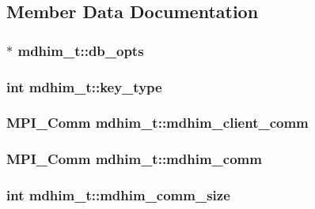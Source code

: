 \subsection{Member Data Documentation}
\hypertarget{structmdhim__t_a1e315ee5168e22e71f970eea38014375}{
\subsubsection[{db\-\_\-opts}]{$\ast$ mdhim\-\_\-t\-::db\-\_\-opts}}\label{structmdhim__t_a1e315ee5168e22e71f970eea38014375}
\hypertarget{structmdhim__t_ab38232f8b8b48edf417c87088d81d6e4}{
\subsubsection[{key\-\_\-type}]{\setlength{\rightskip}{0pt plus 5cm}int mdhim\-\_\-t\-::key\-\_\-type}}\label{structmdhim__t_ab38232f8b8b48edf417c87088d81d6e4}
\hypertarget{structmdhim__t_aa7869e9170df4067e8ee986f5e6fda69}{
\subsubsection[{mdhim\-\_\-client\-\_\-comm}]{\setlength{\rightskip}{0pt plus 5cm}M\-P\-I\-\_\-\-Comm mdhim\-\_\-t\-::mdhim\-\_\-client\-\_\-comm}}\label{structmdhim__t_aa7869e9170df4067e8ee986f5e6fda69}
\hypertarget{structmdhim__t_a9772a2d123d58e9cd3e4514b860aee97}{
\subsubsection[{mdhim\-\_\-comm}]{\setlength{\rightskip}{0pt plus 5cm}M\-P\-I\-\_\-\-Comm mdhim\-\_\-t\-::mdhim\-\_\-comm}}\label{structmdhim__t_a9772a2d123d58e9cd3e4514b860aee97}
\hypertarget{structmdhim__t_ab4bf1dd32ae146382cade22a706c1380}{
\subsubsection[{mdhim\-\_\-comm\-\_\-size}]{\setlength{\rightskip}{0pt plus 5cm}int mdhim\-\_\-t\-::mdhim\-\_\-comm\-\_\-size}}\label{structmdhim__t_ab4bf1dd32ae146382cade22a706c1380}
